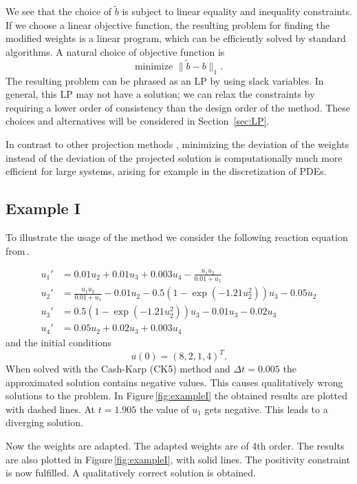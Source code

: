 \documentclass[a4paper]{article}
\numberwithin{equation}{section}
\theoremstyle{plain}
\theoremstyle{definition}
\numberwithin{theorem}{section}
\newcommand{\dt}{{\Delta t}}
\newcommand{\1}{\mathbbm{1}}
\newcommand{\bt}{\tilde{b}}
\begin{document}
We see that the choice of $\bt$ is subject to linear equality and inequality
constraints.  If we choose a linear objective function, the resulting problem
for finding the modified weights is a linear program, which can be efficiently
solved by standard algorithms.  A natural choice of objective function is
$$
\text{minimize } \|\bt - b\|_1.
$$
The resulting problem can be phrased as an LP by using slack variables.
In general, this LP may not have a solution; we can relax the constraints
by requiring a lower order of consistency than the design order of the
method.  These choices and alternatives will be considered in Section~\ref{sec:LP}.

In contrast to other projection methods
\cite{shampine1986conservation,sandu2001positive},
minimizing the deviation of the weights instead of the deviation
of the projected solution is computationally much more efficient
for large systems, arising for example in the discretization of
PDEs.


\subsection{Example I}\label{sec:example_reac}

To illustrate the usage of the method we consider the following reaction equation from\,\cite{kopecz_comparison_2019}.

\begin{subequations}
\label{eq:Reaction}
\begin{align}
u_1' &= 0.01u_2 + 0.01 u_3 +0.003u_4 - \frac{u_1 u_2}{0.01+u_1} \\ 
u_2' &= \frac{u_1u_2}{0.01+u_1}-0.01 u_2-0.5(1-\exp(-1.21 u_2^2)) u_3 -0.05 u_2 \\ 
u_3' &= 0.5(1-\exp(-1.21u_2^2)) u_3 - 0.01 u_3 -0.02 u_3 \\ 
u_4' &=0.05 u_2 + 0.02 u_3 + 0.003u_4 
\end{align}
\end{subequations}
and the initial conditions
\begin{equation}
u(0) = (8,2,1,4)^T.
\end{equation}
When solved with the Cash-Karp (CK5) method and $\dt = 0.005$ the approximated solution contains negative values. This causes qualitatively wrong solutions to the problem. 
In Figure\,\ref{fig:exampleI} the obtained results are plotted with dashed lines. 
At $t=1.905$ the value of $u_1$ gets negative. This leads to a diverging solution.

Now the weights are adapted. The adapted weights are of 4th order. The results are also plotted in Figure\,\ref{fig:exampleI}, with solid lines. 
The positivity constraint is now fulfilled. A qualitatively correct solution is obtained.
\end{document}
